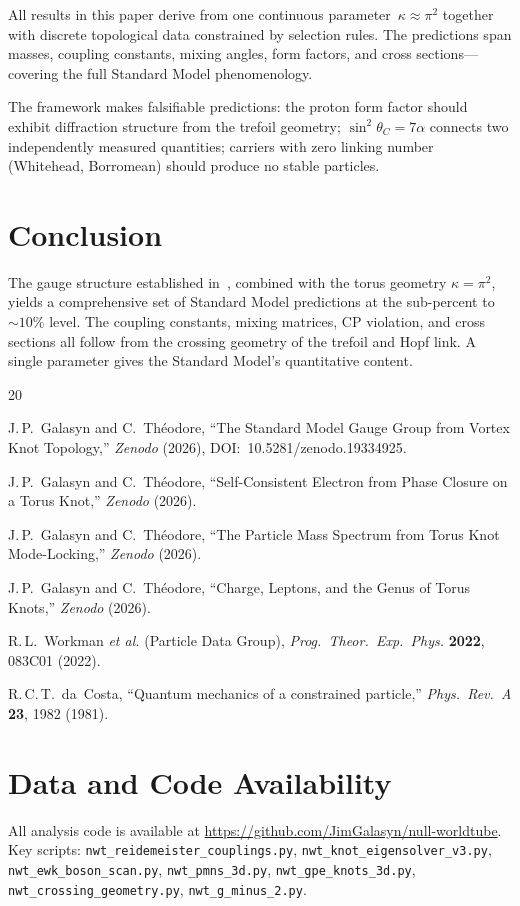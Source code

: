 \documentclass[11pt,a4paper]{article}
\begin{document}
All results in this paper derive from one continuous
parameter~$\kappa \approx \pi^2$ together with discrete
topological data constrained by selection rules.  The
predictions span masses, coupling constants, mixing angles,
form factors, and cross sections---covering the full Standard
Model phenomenology.

The framework makes falsifiable predictions: the proton form
factor should exhibit diffraction structure from the trefoil
geometry; $\sin^2\theta_C = 7\alpha$ connects two independently
measured quantities; carriers with zero linking number
(Whitehead, Borromean) should produce no stable particles.


\section{Conclusion}
\label{sec:conclusion}

The gauge structure established in~\cite{paper8},
combined with the torus geometry $\kappa = \pi^2$, yields a
comprehensive set of Standard Model predictions at the
sub-percent to $\sim\!10\%$ level.  The coupling constants,
mixing matrices, CP violation, and cross sections all follow
from the crossing geometry of the trefoil and Hopf link.
A single parameter gives the Standard Model's quantitative
content.


\begin{thebibliography}{20}

J.\,P.~Galasyn and C.~Th\'eodore,
``The Standard Model Gauge Group from Vortex Knot Topology,''
\emph{Zenodo} (2026), DOI:~10.5281/zenodo.19334925.

J.\,P.~Galasyn and C.~Th\'eodore,
``Self-Consistent Electron from Phase Closure on a Torus Knot,''
\emph{Zenodo} (2026).

J.\,P.~Galasyn and C.~Th\'eodore,
``The Particle Mass Spectrum from Torus Knot Mode-Locking,''
\emph{Zenodo} (2026).

J.\,P.~Galasyn and C.~Th\'eodore,
``Charge, Leptons, and the Genus of Torus Knots,''
\emph{Zenodo} (2026).

R.\,L.~Workman \textit{et al.} (Particle Data Group),
\emph{Prog.\ Theor.\ Exp.\ Phys.} \textbf{2022}, 083C01 (2022).

R.\,C.\,T.~da~Costa,
``Quantum mechanics of a constrained particle,''
\emph{Phys.\ Rev.\ A} \textbf{23}, 1982 (1981).

\end{thebibliography}

\section*{Data and Code Availability}

All analysis code is available at
\url{https://github.com/JimGalasyn/null-worldtube}.
Key scripts: \texttt{nwt\_reidemeister\_couplings.py},
\texttt{nwt\_knot\_eigensolver\_v3.py},
\texttt{nwt\_ewk\_boson\_scan.py},
\texttt{nwt\_pmns\_3d.py},
\texttt{nwt\_gpe\_knots\_3d.py},
\texttt{nwt\_crossing\_geometry.py},
\texttt{nwt\_g\_minus\_2.py}.
\end{document}
